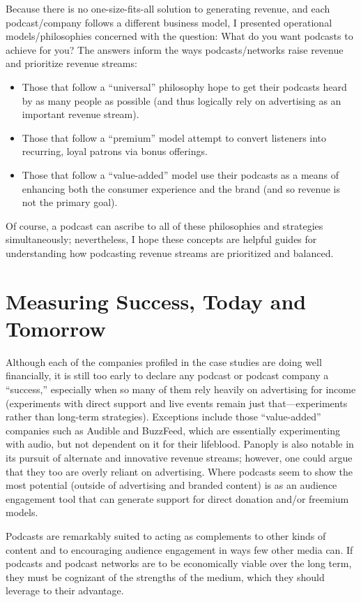 \documentclass[notoc, symmetric, nobib, nols]{towcenter-guideto-book}
\begin{document}
Because there is no one-size-fits-all solution to generating revenue, and each podcast/company follows a different business model, I presented operational models/philosophies concerned with the question: What do you want podcasts to achieve for you? The answers inform the ways podcasts/networks raise revenue and prioritize revenue streams:
 
\begin{itemize}
\item Those that follow a ``universal'' philosophy hope to get their podcasts heard by as many people as possible (and thus logically rely on advertising as an important revenue stream). 
\item Those that follow a ``premium'' model attempt to convert listeners into recurring, loyal patrons via bonus offerings. 
\item Those that follow a ``value-added'' model use their podcasts as a means of enhancing both the consumer experience and the brand (and so revenue is not the primary goal).
\end{itemize} 

Of course, a podcast can ascribe to all of these philosophies and strategies simultaneously; nevertheless, I hope these concepts are helpful guides for understanding how podcasting revenue streams are prioritized and balanced. 

\section{Measuring Success, Today and Tomorrow}

Although each of the companies profiled in the case studies are doing well financially, it is still too early to declare any podcast or podcast company a ``success,'' especially when so many of them rely heavily on advertising for income (experiments with direct support and live events remain just that---experiments rather than long-term strategies). Exceptions include those ``value-added'' companies such as Audible and BuzzFeed, which are essentially experimenting with audio, but not dependent on it for their lifeblood. Panoply is also notable in its pursuit of alternate and innovative revenue streams; however, one could argue that they too are overly reliant on advertising. Where podcasts seem to show the most potential (outside of advertising and branded content) is as an audience engagement tool that can generate support for direct donation and/or freemium models. 

Podcasts are remarkably suited to acting as complements to other kinds of content and to encouraging audience engagement in ways few other media can. If podcasts and podcast networks are to be economically viable over the long term, they must be cognizant of the strengths of the medium, which they should leverage to their advantage.
\end{document}
